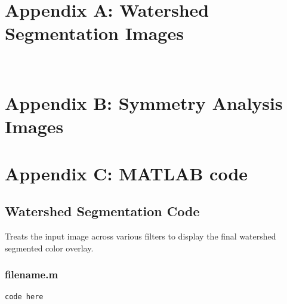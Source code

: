 \documentclass[12pt]{article}
\theoremstyle{plain}%
\theoremstyle{definition}
\theoremstyle{remark}
\begin{document}
\section{Appendix A: Watershed Segmentation Images}
\begin{figure}[!h]
	\centering
		\mbox{\quad
		}
\end{figure}

\section{Appendix B: Symmetry Analysis Images}

\section{Appendix C: MATLAB code}
\subsection{Watershed Segmentation Code}
Treats the input image across various filters to display the final watershed segmented color overlay.
\subsubsection{filename.m}
\begin{verbatim}
code here
\end{verbatim}
\end{document}
